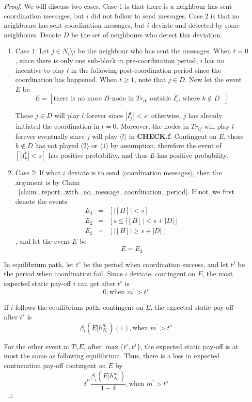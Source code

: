 \documentclass[12pt]{article}
\theoremstyle{remark}
\theoremstyle{remark}
\begin{document}
\begin{proof}

We will discuss two cases. Case 1 is that there is a neighbour has sent coordination messages, but $i$ did not follow to send messages. Case 2 is that no neighbours has sent coordination messages, but $i$ deviate and detected by some neighbours. Denote $D$ be the set of neighbours who detect this deviation. 

\begin{enumerate}
\item Case 1: Let $j\in N_i\setminus i$ be the neighbour who has sent the messages. When $t=0$, since there is only one sub-block in pre-coordination period, $i$ has no incentive to play $l$ in the following post-coordination period since the coordination has happened. When $t\geq 1$, note that $j\in D$. Now let the event $E$ be 
\[E=[\text{there is no more $H$-node in $Tr_{ik}$ outside $I^t_i$, where $k\notin D$ }]\] 

Those $j\in D$ will play $l$ forever since $|I^{0}_j|<s$; otherwise, $j$ has already initiated the coordination in $t=0$. Moreover, the nodes in $Tr_{ij}$ will play $l$ forever eventually since $j$ will play $\langle l \rangle$ in \textbf{CHECK.f}. Contingent on $E$, those $k\notin D$ has not played $\langle 2 \rangle$ or $\langle 1 \rangle$ by assumption, therefore the event of $[|I^{t}_k|<s]$ has positive probability, and thus $E$ has positive probability.

\item Case 2: If what $i$ deviate is to send $\langle \text{coordination messages} \rangle$, then the argument is by Claim ~\ref{claim_report_with_no_message_coordination_period}. If not, we first denote the events 
\begin{eqnarray*}
E_1 &= & [|[H]|<s]\\
E_2 &= & [s\leq |[H]| < s+|D|]\\
E_3 &= & [|[H]| \geq s+|D|]
\end{eqnarray*}
, and let the event $E$ be
\[E=E_2\] 
\end{enumerate}

In equilibrium path, let $t^{s}$ be the period when coordination success, and let $t^{f}$ be the period when coordination fail. Since $i$ deviate, contingent on $E$, the most expected static pay-off $i$ can get after $t^{s}$ is
 \[0, \text{when } m^{'}> t^{s}\]

If $i$ follows the equilibrium path, contingent on $E$, the expected static pay-off after $t^s$ is
 \[\beta_{i}(E|h^{m^{'}}_{N_i})(1), \text{when } m^{'}> t^s\]

For the other event in $T\setminus E$, after $\max\{t^s,t^f\}$, the expected static pay-off is at most the same as following equilibrium. Thus, there is a loss in expected continuation pay-off contingent on $E$ by
\[\delta^{t^s}\frac{\beta_{i}(E|h^{m^{'}}_{N_i})}{1-\delta}, \text{when } m^{'}> t^s\]




\end{proof}
\end{document}
